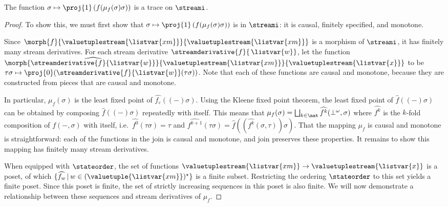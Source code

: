 \begin{proposition}[\protect\footnotemark]
    The function \(\sigma \mapsto \proj{1}\left(f(\mu_f(\sigma)\sigma)\right)\)
    is a trace on \(\streami\).
\end{proposition}
\begin{proof}
    To show this, we must first show that
    \(\sigma \mapsto \proj{1}\left(f(\mu_f(\sigma)\sigma)\right)\) is in
    \(\streami\): it is causal, finitely specified, and monotone.

    Since \(
        \morph{f}{\valuetuplestream{\listvar{xm}}}{\valuetuplestream{\listvar{xm}}}
    \) is a morphism of \(\streami\), it has finitely many stream derivatives.
    For each stream derivative \(\streamderivative{f}{\,\listvar{w}}\), let the
    function \(
        \morph{
            \widehat{\streamderivative{f}{\listvar{w}}}
        }{
            \valuetuplestream{\listvar{xm}}
        }{
            \valuetuplestream{\listvar{x}}
        }
    \) to be \(
        \tau\sigma
        \mapsto
        \proj{0}(\streamderivative{f}{\listvar{w}}(\tau\sigma))
    \).
    Note that each of these functions are causal and monotone, because they are
    constructed from pieces that are causal and monotone.

    In particular, \(\mu_f(\sigma)\) is the least fixed point of
    \(\widehat{f_\varepsilon}\left((-)\sigma\right)\).
    Using the Kleene fixed point theorem, the least fixed point of
    \(\widehat{f}((-)\sigma)\) can be obtained by composing
    \(\widehat{f}((-)\sigma)\) repeatedly with itself.
    This means that \(
        \mu_f(\sigma)
        =
        \bigsqcup_{k \in \nat} \widehat{f^k}(\bot^\omega,\sigma)
    \) where \(\widehat{f^k}\) is the \(k\)-fold composition of \(f(-,\sigma)\)
    with itself, i.e.\ \(\widehat{f^0}(\tau\sigma) = \tau\) and \(
        \widehat{f^{k+1}}(\tau\sigma)
        =
        \widehat{f}\left(\left(\widehat{f^{k}}(\sigma, \tau)\right)\sigma\right)
    \).
    That the mapping \(\mu_f\) is causal and monotone is
    straightforward: each of the functions in the join is causal and monotone,
    and join preserves these properties.
    It remains to show this mapping has finitely many stream derivatives.

    When equipped with \(\stateorder\), the set of functions
    \(\valuetuplestream{\listvar{xm}} \to \valuetuplestream{\listvar{x}}\)
    is a poset, of which
    \(\{\widehat{f_w} \,|\, w \in (\valuetuple{\listvar{xm}})^\star\}\)
    is a finite subset.
    Restricting the ordering \(\stateorder\) to this set yields a finite poset.
    Since this poset is finite, the set of strictly increasing sequences in this
    poset is also finite.
    We will now demonstrate a relationship between these sequences and stream
    derivatives of \(\mu_f\).


\end{proof}

